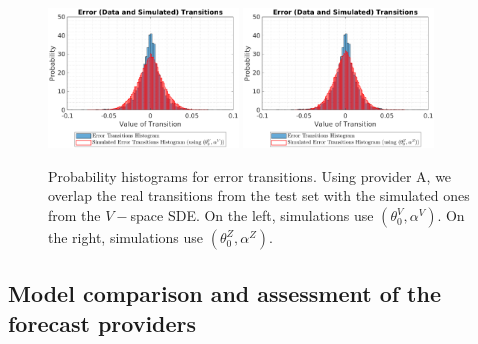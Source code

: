 \documentclass[11pt]{article}
\theoremstyle{definition}
\begin{document}
\begin{figure}[ht!]
\centering
\includegraphics[width=0.45\textwidth]{plots/classic_noDelta/Optimal.eps}
\includegraphics[width=0.45\textwidth]{plots/classic_noDelta/Lamperti_Optimal.eps}
\caption{Probability histograms for error transitions. Using provider A, we overlap the real transitions from the test set with the simulated ones from the $V-$space SDE. On the left, simulations use $(\theta_0^V,\alpha^V)$. On the right, simulations use $(\theta_0^Z,\alpha^Z)$.}
\label{fig:hists}
\end{figure}

\subsection{Model comparison and assessment of the forecast providers} \label{Model_Comp}
\end{document}
